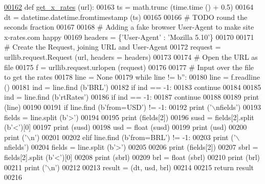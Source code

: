 \begin{DoxyCode}
\hypertarget{namespaceraw__urlparser.tex_l00162}{}\hyperlink{namespaceraw__urlparser_ab9602b24afd1ae28d96beb085c37410e}{00162} \textcolor{keyword}{def }\hyperlink{namespaceraw__urlparser_ab9602b24afd1ae28d96beb085c37410e}{get\_x\_rates} (url):
00163     ts = math.trunc (time.time () + 0.5)
00164     dt = datetime.datetime.fromtimestamp (ts)
00165     
00166     \textcolor{comment}{# TODO round the seconds fraction}
00167     
00168     \textcolor{comment}{# Adding a fake browser User-Agent to make site x-rates.com happy}
00169     headers = \{\textcolor{stringliteral}{'User-Agent'} : \textcolor{stringliteral}{'Mozilla 5.10'}\}
00170         
00171     \textcolor{comment}{# Create the Request, joining URL and User-Agent}
00172     request = urllib.request.Request (url, headers = headers)
00173 
00174     \textcolor{comment}{# Open the URL as file}
00175     f = urllib.request.urlopen (request)
00176     
00177     \textcolor{comment}{# Input over the file to get the rates}
00178     line = \textcolor{keywordtype}{None}
00179     \textcolor{keywordflow}{while} line != b\textcolor{stringliteral}{''}:
00180         line = f.readline ()
00181         ind = line.find (b\textcolor{stringliteral}{'BRL'})
00182         \textcolor{keywordflow}{if} ind == -1:
00183             \textcolor{keywordflow}{continue} 
00184         
00185         ind = line.find (b\textcolor{stringliteral}{'rtRates'})
00186         \textcolor{keywordflow}{if} ind == -1:
00187             \textcolor{keywordflow}{continue} 
00188         
00189         \textcolor{keywordflow}{print} (line)
00190         
00191         \textcolor{keywordflow}{if} line.find (b\textcolor{stringliteral}{'from=USD'}) != -1:
00192             \textcolor{keywordflow}{print} (\textcolor{stringliteral}{'\(\backslash\)nfields'})
00193             fields = line.split (b\textcolor{stringliteral}{'>'})
00194             
00195             \textcolor{keywordflow}{print} (fields[2])
00196             susd = fields[2].split (b\textcolor{stringliteral}{'<'})[0]
00197             \textcolor{keywordflow}{print} (susd)
00198             usd = float (susd)
00199             \textcolor{keywordflow}{print} (usd)
00200             \textcolor{keywordflow}{print} (\textcolor{stringliteral}{'\(\backslash\)n'})
00201         
00202         \textcolor{keywordflow}{elif} line.find (b\textcolor{stringliteral}{'from=BRL'}) != -1:
00203             \textcolor{keywordflow}{print} (\textcolor{stringliteral}{'\(\backslash\)nfields'})
00204             fields = line.split (b\textcolor{stringliteral}{'>'})
00205             
00206             \textcolor{keywordflow}{print} (fields[2])
00207             sbrl = fields[2].split (b\textcolor{stringliteral}{'<'})[0]
00208             \textcolor{keywordflow}{print} (sbrl)
00209             brl = float (sbrl)
00210             \textcolor{keywordflow}{print} (brl)
00211             \textcolor{keywordflow}{print} (\textcolor{stringliteral}{'\(\backslash\)n'})
00212             
00213     result = (dt, usd, brl)
00214     
00215     \textcolor{keywordflow}{return} result
00216 
\end{DoxyCode}


